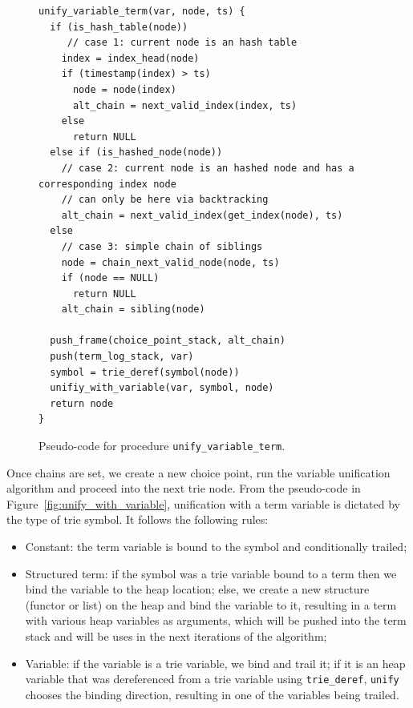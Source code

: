 \begin{figure}[ht]
\begin{Verbatim}
unify_variable_term(var, node, ts) {
  if (is_hash_table(node))
     // case 1: current node is an hash table
    index = index_head(node)
    if (timestamp(index) > ts)
      node = node(index)
      alt_chain = next_valid_index(index, ts)
    else
      return NULL
  else if (is_hashed_node(node))
    // case 2: current node is an hashed node and has a corresponding index node
    // can only be here via backtracking
    alt_chain = next_valid_index(get_index(node), ts)
  else
    // case 3: simple chain of siblings
    node = chain_next_valid_node(node, ts)
    if (node == NULL)
      return NULL
    alt_chain = sibling(node)
  
  push_frame(choice_point_stack, alt_chain)
  push(term_log_stack, var)
  symbol = trie_deref(symbol(node))
  unifiy_with_variable(var, symbol, node)
  return node
}
\end{Verbatim}
\caption{Pseudo-code for procedure \texttt{unify\_variable\_term}.}
\label{fig:unify_variable_term}
\end{figure}

\begin{samepage}

Once chains are set, we create a new choice point, run the variable unification algorithm
and proceed into the next trie node.
From the pseudo-code in Figure~\ref{fig:unify_with_variable}, unification with a term variable
is dictated by the type of trie symbol. It follows the following rules:

\begin{itemize}
  \item Constant: the term variable is bound to the symbol and conditionally trailed;
  \item Structured term: if the symbol was a trie variable bound to a term then we bind
  the variable to the heap location; else, we create a new structure (functor or list) on the heap and bind
  the variable to it, resulting in a term with various heap variables as arguments, which will be pushed into
  the term stack and will be uses in the next iterations of the algorithm;
  \item Variable: if the variable is a trie variable, we bind and trail it; if it is an heap variable that
  was dereferenced from a trie variable using \texttt{trie\_deref}, \texttt{unify} chooses the binding direction,
  resulting in one of the variables being trailed.
\end{itemize}
\end{samepage}


